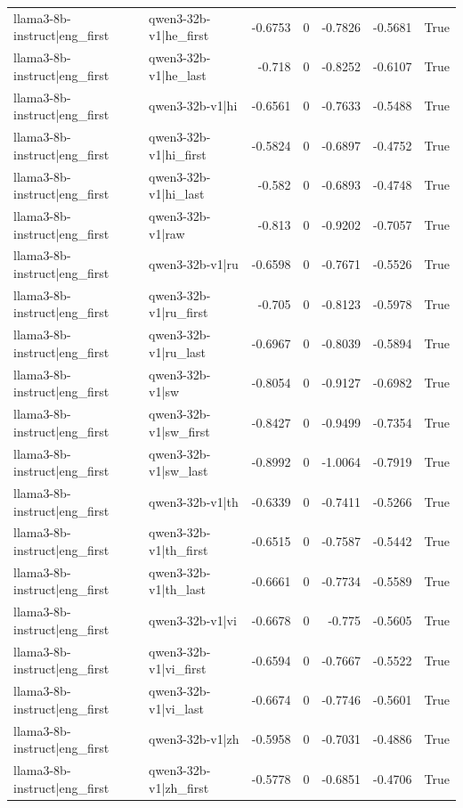 \begin{table}
\begin{tabular}{l l r r r r l}
llama3-8b-instruct|eng_first & qwen3-32b-v1|he_first & -0.6753 & 0 & -0.7826 & -0.5681 & True \\
llama3-8b-instruct|eng_first & qwen3-32b-v1|he_last & -0.718 & 0 & -0.8252 & -0.6107 & True \\
llama3-8b-instruct|eng_first & qwen3-32b-v1|hi & -0.6561 & 0 & -0.7633 & -0.5488 & True \\
llama3-8b-instruct|eng_first & qwen3-32b-v1|hi_first & -0.5824 & 0 & -0.6897 & -0.4752 & True \\
llama3-8b-instruct|eng_first & qwen3-32b-v1|hi_last & -0.582 & 0 & -0.6893 & -0.4748 & True \\
llama3-8b-instruct|eng_first & qwen3-32b-v1|raw & -0.813 & 0 & -0.9202 & -0.7057 & True \\
llama3-8b-instruct|eng_first & qwen3-32b-v1|ru & -0.6598 & 0 & -0.7671 & -0.5526 & True \\
llama3-8b-instruct|eng_first & qwen3-32b-v1|ru_first & -0.705 & 0 & -0.8123 & -0.5978 & True \\
llama3-8b-instruct|eng_first & qwen3-32b-v1|ru_last & -0.6967 & 0 & -0.8039 & -0.5894 & True \\
llama3-8b-instruct|eng_first & qwen3-32b-v1|sw & -0.8054 & 0 & -0.9127 & -0.6982 & True \\
llama3-8b-instruct|eng_first & qwen3-32b-v1|sw_first & -0.8427 & 0 & -0.9499 & -0.7354 & True \\
llama3-8b-instruct|eng_first & qwen3-32b-v1|sw_last & -0.8992 & 0 & -1.0064 & -0.7919 & True \\
llama3-8b-instruct|eng_first & qwen3-32b-v1|th & -0.6339 & 0 & -0.7411 & -0.5266 & True \\
llama3-8b-instruct|eng_first & qwen3-32b-v1|th_first & -0.6515 & 0 & -0.7587 & -0.5442 & True \\
llama3-8b-instruct|eng_first & qwen3-32b-v1|th_last & -0.6661 & 0 & -0.7734 & -0.5589 & True \\
llama3-8b-instruct|eng_first & qwen3-32b-v1|vi & -0.6678 & 0 & -0.775 & -0.5605 & True \\
llama3-8b-instruct|eng_first & qwen3-32b-v1|vi_first & -0.6594 & 0 & -0.7667 & -0.5522 & True \\
llama3-8b-instruct|eng_first & qwen3-32b-v1|vi_last & -0.6674 & 0 & -0.7746 & -0.5601 & True \\
llama3-8b-instruct|eng_first & qwen3-32b-v1|zh & -0.5958 & 0 & -0.7031 & -0.4886 & True \\
llama3-8b-instruct|eng_first & qwen3-32b-v1|zh_first & -0.5778 & 0 & -0.6851 & -0.4706 & True \\

\end{tabular}
\end{table}
